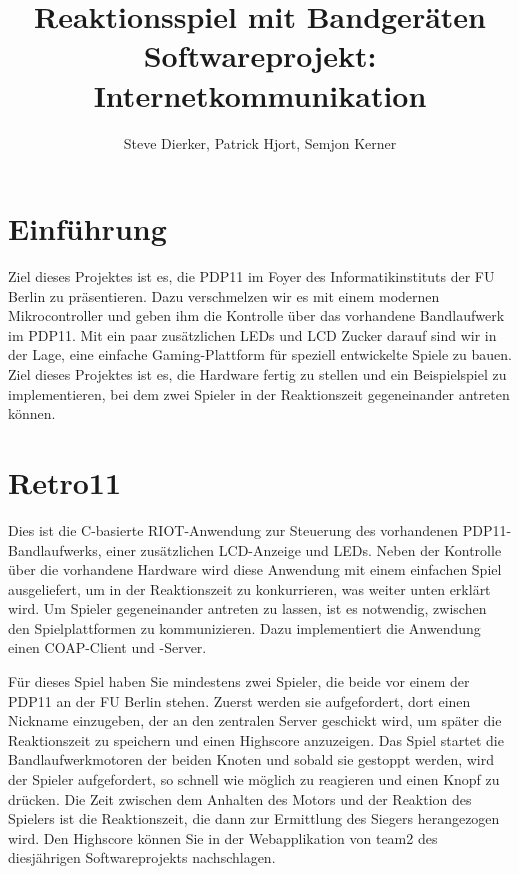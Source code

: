 \documentclass[a4paper]{article}
\title{%
  Reaktionsspiel mit Bandgeräten \\
  \large Softwareprojekt: Internetkommunikation}
\author{Steve Dierker, Patrick Hjort, Semjon Kerner}
\begin{document}
\maketitle

\section{Einführung}
\label{sec:intro}
Ziel dieses Projektes ist es, die PDP11 im Foyer des Informatikinstituts der FU Berlin zu präsentieren. Dazu verschmelzen wir es mit einem modernen Mikrocontroller und geben ihm die Kontrolle über das vorhandene Bandlaufwerk im PDP11. Mit ein paar zusätzlichen LEDs und LCD Zucker darauf sind wir in der Lage, eine einfache Gaming-Plattform für speziell entwickelte Spiele zu bauen. Ziel dieses Projektes ist es, die Hardware fertig zu stellen und ein Beispielspiel zu implementieren, bei dem zwei Spieler in der Reaktionszeit gegeneinander antreten können.

\section{Retro11}
Dies ist die C-basierte RIOT-Anwendung zur Steuerung des vorhandenen PDP11-Bandlaufwerks, einer zusätzlichen LCD-Anzeige und LEDs. Neben der Kontrolle über die vorhandene Hardware wird diese Anwendung mit einem einfachen Spiel ausgeliefert, um in der Reaktionszeit zu konkurrieren, was weiter unten erklärt wird. Um Spieler gegeneinander antreten zu lassen, ist es notwendig, zwischen den Spielplattformen zu kommunizieren. Dazu implementiert die Anwendung einen COAP-Client und -Server.

Für dieses Spiel haben Sie mindestens zwei Spieler, die beide vor einem der PDP11 an der FU Berlin stehen. Zuerst werden sie aufgefordert, dort einen Nickname einzugeben, der an den zentralen Server geschickt wird, um später die Reaktionszeit zu speichern und einen Highscore anzuzeigen. Das Spiel startet die Bandlaufwerkmotoren der beiden Knoten und sobald sie gestoppt werden, wird der Spieler aufgefordert, so schnell wie möglich zu reagieren und einen Knopf zu drücken. Die Zeit zwischen dem Anhalten des Motors und der Reaktion des Spielers ist die Reaktionszeit, die dann zur Ermittlung des Siegers herangezogen wird. Den Highscore können Sie in der Webapplikation von team2 des diesjährigen Softwareprojekts nachschlagen.
\end{document}
